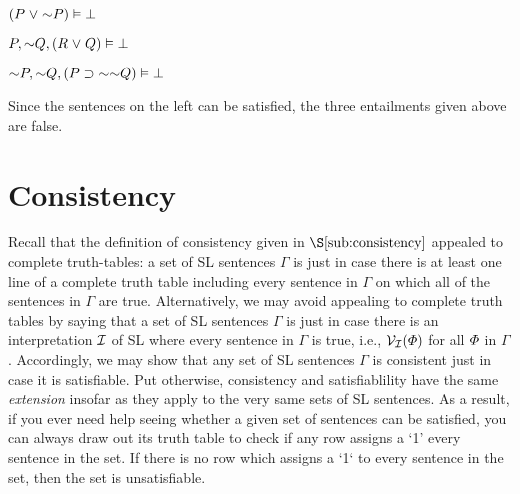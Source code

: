\begin{earg}
\item[] $(P \eor \enot P) \models\bot$
\item[] $P, \enot Q, (R \eor Q) \models\bot$
\item[] $\enot P, \enot Q, (P \eif \enot\enot Q) \models\bot$
\end{earg}

Since the sentences on the left can be satisfied, the three entailments given above are false.



\section{Consistency}
  \label{sec:consistency}

Recall that the definition of consistency given in $\S\ref{sub:consistency}$ appealed to complete truth-tables: a set of SL sentences $\Gamma$ is  just in case there is at least one line of a complete truth table including every sentence in $\Gamma$ on which all of the sentences in $\Gamma$ are true.
Alternatively, we may avoid appealing to complete truth tables by saying that a set of SL sentences $\Gamma$ is  just in case there is an interpretation $\mathcal{I}$ of SL where every sentence in $\Gamma$ is true, i.e., $\mathcal{V}_{\mathcal{I}}(\varPhi)$ for all $\varPhi$ in $\Gamma$.\label{def.consistencySL}
Accordingly, we may show that any set of SL sentences $\Gamma$ is consistent just in case it is satisfiable. 
Put otherwise, consistency and satisfiablility have the same \textit{extension} insofar as they apply to the very same sets of SL sentences.
As a result, if you ever need help seeing whether a given set of sentences can be satisfied, you can always draw out its truth table to check if any row assigns a `1' every sentence in the set.
If there is no row which assigns a `1` to every sentence in the set, then the set is unsatisfiable.




